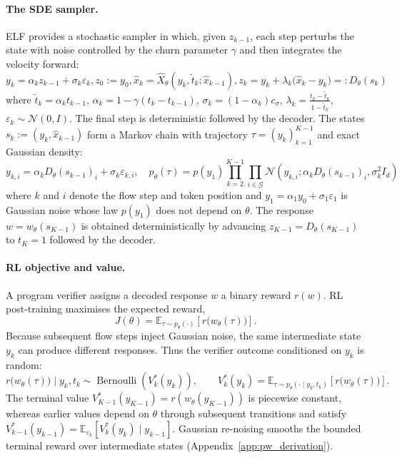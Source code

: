 \paragraph{The SDE sampler.}
ELF provides a stochastic sampler in which, given $z_{k-1}$, each step perturbs the state with noise controlled by the churn parameter 
$\gamma$ and then integrates the velocity forward:
\begin{equation}
y_k=\alpha_k z_{k-1}+\sigma_k\varepsilon_k, z_0:=y_0, \hat x_k=\hat X_\theta(y_k,\tilde t_k;\hat x_{k-1}), z_k=y_k+\lambda_k\big(\hat x_k-y_k\big)=:D_\theta(s_k)
\end{equation}
where $\tilde t_k=\alpha_k t_{k-1}$, $\alpha_k=1-\gamma (t_k-t_{k-1})$, $\sigma_k=(1-\alpha_k)c_\sigma$, $\lambda_k=\frac{t_k-\tilde t_k}{1-\tilde t_k}$, $\varepsilon_k \sim \mathcal N(0,I)$. The final step is deterministic followed by the decoder. The states $s_k:=(y_k,\hat x_{k-1})$ form a Markov chain with trajectory $\tau=(y_k)_{k=1}^{K-1}$ and exact Gaussian density:
\begin{equation}
y_{k,i}=\alpha_kD_\theta(s_{k-1})_i+\sigma_k\varepsilon_{k,i}, \quad p_\theta(\tau)=p(y_1)\prod_{k=2}^{K-1}\prod_{i\in\mathcal G}\mathcal N\!\left(y_{k,i};\alpha_kD_\theta(s_{k-1})_i,\sigma_k^2I_d\right)
\label{eq:chain}
\end{equation}
where $k$ and $i$ denote the flow step and token position and $y_1=\alpha_1y_0+\sigma_1\varepsilon_1$ is Gaussian noise whose law $p(y_1)$ does not depend on $\theta$. The response $w=w_\theta(s_{K-1})$ is obtained deterministically by advancing $z_{K-1}=D_{\theta}(s_{K-1})$ to $t_K=1$ followed by the decoder.

\paragraph{RL objective and value.}
A program verifier assigns a decoded response $w$ a binary reward $r(w)$. RL post-training maximises the expected reward,
\begin{equation}
J(\theta)
=
\mathbb E_{\tau\sim p_\theta(\cdot)}
\left[
r\bigl(w_\theta(\tau)\bigr)
\right].
\label{eq:objective}
\end{equation}
Because subsequent flow steps inject Gaussian noise, the same intermediate state $y_k$ can produce different responses. Thus the verifier outcome conditioned on $y_k$ is random:
\begin{equation}
r\bigl(w_\theta(\tau)\bigr) \mid y_k, t_k
\sim
\operatorname{Bernoulli}\!\left(V_k^*(y_k)\right),
\qquad
V_k^*(y_k)
=
\mathbb E_{\tau\sim p_\theta(\cdot\mid y_k,t_k)}
\!\left[r\bigl(w_\theta(\tau)\bigr)\right].
\label{eq:value}
\end{equation}
The terminal value $V_{K-1}^*(y_{K-1})=r(w_\theta(y_{K-1}))$ is piecewise constant, whereas earlier values depend on $\theta$ through subsequent transitions and satisfy $V_{k-1}^*(y_{k-1})=\mathbb E_{\varepsilon_k} \left[V_k^*(y_k)\mid y_{k-1}\right]$. Gaussian re-noising smooths the bounded terminal reward over intermediate states (Appendix~\ref{app:pw_derivation}).

